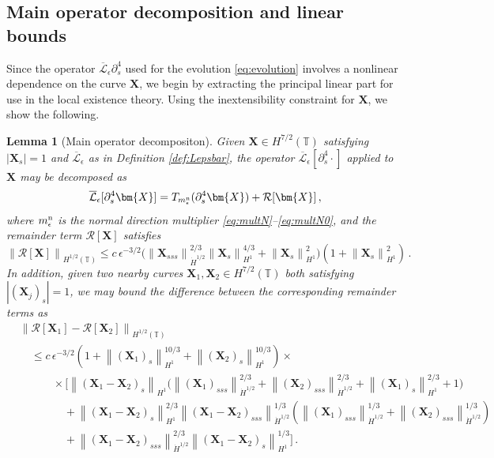 \documentclass[11pt,reqno]{amsart}
\newcommand{\T}{\mathbb{T}}
\newcommand{\X}{\bm{X}}
\newcommand{\p}{\partial}
\newcommand{\abs}[1]{\left\lvert #1 \right\rvert}
\newcommand{\norm}[1]{\left\lVert #1 \right\rVert}
\newcommand{\mc}[1]{\mathcal{#1}}
\numberwithin{equation}{section}
\newtheorem{lemma}[theorem]{Lemma}
\theoremstyle{definition}
\begin{document}
\subsection{Main operator decomposition and linear bounds}\label{subsec:mainOpDecomp}
Since the operator $\overline{\mc{L}}_\epsilon\p_s^4$ used for the evolution \eqref{eq:evolution} involves a nonlinear dependence on the curve $\X$, we begin by extracting the principal linear part for use in the local existence theory. Using the inextensibility constraint for $\X$, we show the following. 
%
\begin{lemma}[Main operator decompositon]\label{lem:op_decomp}
  Given $\X\in H^{7/2}(\T)$ satisfying $\abs{\X_s}=1$ and $\overline{\mc{L}}_\epsilon$ as in Definition \ref{def:Lepsbar}, the operator $\overline{\mc{L}}_\epsilon[\p_s^4\cdot]$ applied to $\X$ may be decomposed as 
  \begin{equation}
  \overline{\mc{L}}_\epsilon[\p_s^4\X] = T_{m_\epsilon^{\rm n}}(\p_s^4\X) + \mc{R}[\X]\,,
  \end{equation}
  where $m_\epsilon^{\rm n}$ is the normal direction multiplier \eqref{eq:multN}--\eqref{eq:multN0}, and the remainder term $\mc{R}[\X]$ satisfies
  \begin{equation}\label{eq:RX_bound}
  \norm{\mc{R}[\X]}_{H^{1/2}(\T)} \le c\,\epsilon^{-3/2}\big(\norm{\X_{sss}}_{\dot H^{1/2}}^{2/3}\norm{\X_s}_{H^1}^{4/3} + \norm{\X_s}_{H^1}^2 \big)(1+\norm{\X_s}_{H^1}^2)\,.
  \end{equation}
  In addition, given two nearby curves $\X_1,\X_2\in H^{7/2}(\T)$ both satisfying $\abs{(\X_j)_s}=1$, we may bound the difference between the corresponding remainder terms as
  \begin{equation}\label{eq:RX_lip}
  \begin{aligned}
  &\norm{\mc{R}[\X_1]-\mc{R}[\X_2]}_{H^{1/2}(\T)}\\
  &\quad \le c\,\epsilon^{-3/2}(1+\norm{(\X_1)_s}_{H^1}^{10/3}+\norm{(\X_2)_s}_{H^1}^{10/3})\times\\
  &\qquad\quad \times \bigg[\norm{(\X_1-\X_2)_s}_{H^1}\bigg(\norm{(\X_1)_{sss}}_{\dot H^{1/2}}^{2/3}+\norm{(\X_2)_{sss}}_{\dot H^{1/2}}^{2/3}+\norm{(\X_1)_s}_{H^1}^{2/3}+1\bigg)\\
  &\qquad\qquad + \norm{(\X_1-\X_2)_s}_{H^1}^{2/3}\norm{(\X_1-\X_2)_{sss}}_{\dot H^{1/2}}^{1/3}(\norm{(\X_1)_{sss}}_{\dot H^{1/2}}^{1/3}+\norm{(\X_2)_{sss}}_{\dot H^{1/2}}^{1/3} )\\
  &\qquad\qquad+\norm{(\X_1-\X_2)_{sss}}_{\dot H^{1/2}}^{2/3}\norm{(\X_1-\X_2)_s}_{H^1}^{1/3}\bigg]\,.
  \end{aligned}
  \end{equation}
\end{lemma}
\end{document}
